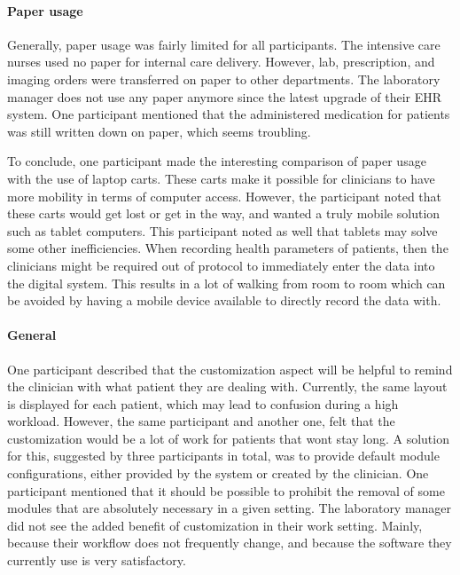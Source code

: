     \paragraph{Paper usage}

    Generally, paper usage was fairly limited for all participants. The intensive care nurses used no paper for internal care delivery. However, lab, prescription, and imaging orders were transferred on paper to other departments. The laboratory manager does not use any paper anymore since the latest upgrade of their EHR system. One participant mentioned that the administered medication for patients was still written down on paper, which seems troubling.

    To conclude, one participant made the interesting comparison of paper usage with the use of laptop carts. These carts make it possible for clinicians to have more mobility in terms of computer access. However, the participant noted that these carts would get lost or get in the way, and wanted a truly mobile solution such as tablet computers. This participant noted as well that tablets may solve some other inefficiencies. When recording health parameters of patients, then the clinicians might be required out of protocol to immediately enter the data into the digital system. This results in a lot of walking from room to room which can be avoided by having a mobile device available to directly record the data with.
    
    \paragraph{General}

    One participant described that the customization aspect will be helpful to remind the clinician with what patient they are dealing with. Currently, the same layout is displayed for each patient, which may lead to confusion during a high workload. However, the same participant and another one, felt that the customization would be a lot of work for patients that wont stay long. A solution for this, suggested by three participants in total, was to provide default module configurations, either provided by the system or created by the clinician. One participant mentioned that it should be possible to prohibit the removal of some modules that are absolutely necessary in a given setting. The laboratory manager did not see the added benefit of customization in their work setting. Mainly, because their workflow does not frequently change, and because the software they currently use is very satisfactory.